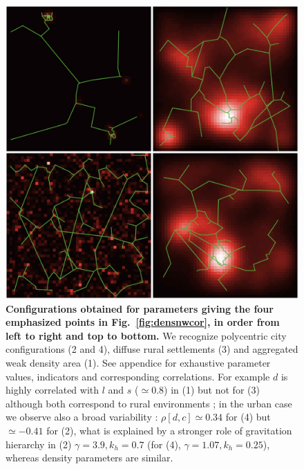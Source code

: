 \documentclass{article}
\begin{document}
\begin{figure}%
\includegraphics[width=\linewidth]{Fig1.jpg}
	\caption{\textbf{Configurations obtained for parameters giving the four emphasized points in Fig.~\ref{fig:densnwcor}, in order from left to right and top to bottom.} We recognize polycentric city configurations (2 and 4), diffuse rural settlements (3) and aggregated weak density area (1). See appendice for exhaustive parameter values, indicators and corresponding correlations. For example $d$ is highly correlated with $l$ and $s$ ($\simeq$0.8) in (1) but not for (3) although both correspond to rural environments ; in the urban case we observe also a broad variability : $\rho[d,c]\simeq 0.34$ for (4) but $\simeq-0.41$ for (2), what is explained by a stronger role of gravitation hierarchy in (2) $\gamma=3.9,k_h=0.7$ (for (4), $\gamma=1.07,k_h=0.25$), whereas density parameters are similar.\label{fig:configexamples}}
\end{figure}
\end{document}
